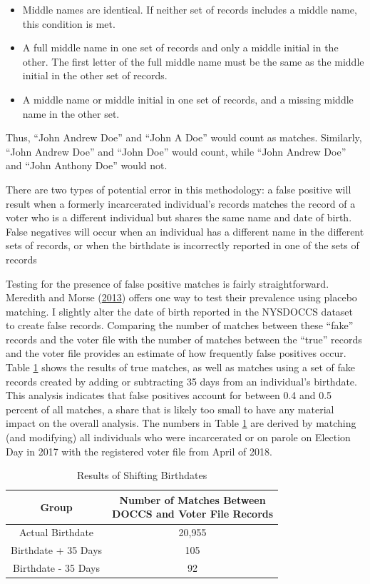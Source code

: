\documentclass[
  12pt,
]{article}
\providecommand{\tightlist}{%
  \setlength{\itemsep}{0pt}\setlength{\parskip}{0pt}}
\begin{document}
\begin{itemize}
\tightlist
\item
  Middle names are identical. If neither set of records includes a middle name, this condition is met.
\item
  A full middle name in one set of records and only a middle initial in the other. The first letter of the full middle name must be the same as the middle initial in the other set of records.
\item
  A middle name or middle initial in one set of records, and a missing middle name in the other set.
\end{itemize}

Thus, ``John Andrew Doe'' and ``John A Doe'' would count as matches. Similarly, ``John Andrew Doe'' and ``John Doe'' would count, while ``John Andrew Doe'' and ``John Anthony Doe'' would not.

There are two types of potential error in this methodology: a false positive will result when a formerly incarcerated individual's records matches the record of a voter who is a different individual but shares the same name and date of birth. False negatives will occur when an individual has a different name in the different sets of records, or when the birthdate is incorrectly reported in one of the sets of records

Testing for the presence of false positive matches is fairly straightforward. Meredith and Morse (\protect\hyperlink{ref-Meredith2013}{2013}) offers one way to test their prevalence using placebo matching. I slightly alter the date of birth reported in the NYSDOCCS dataset to create false records. Comparing the number of matches between these ``fake'' records and the voter file with the number of matches between the ``true'' records and the voter file provides an estimate of how frequently false positives occur. Table \ref{tab:change-dobs} shows the results of true matches, as well as matches using a set of fake records created by adding or subtracting 35 days from an individual's birthdate. This analysis indicates that false positives account for between 0.4 and 0.5 percent of all matches, a share that is likely too small to have any material impact on the overall analysis. The numbers in Table \ref{tab:change-dobs} are derived by matching (and modifying) all individuals who were incarcerated or on parole on Election Day in 2017 with the registered voter file from April of 2018.

\begin{table}[H]

\caption{\label{tab:shift-dobs-chunk}\label{tab:change-dobs} Results of Shifting Birthdates}
\centering
\fontsize{10}{12}\selectfont
\begin{tabular}[t]{cc}
\toprule
Group & \makecell[l]{Number of Matches Between\\DOCCS and Voter File Records}\\
\midrule
Actual Birthdate & 20,955\\
Birthdate + 35 Days & 105\\
Birthdate - 35 Days & 92\\
\bottomrule
\end{tabular}
\end{table}
\end{document}
